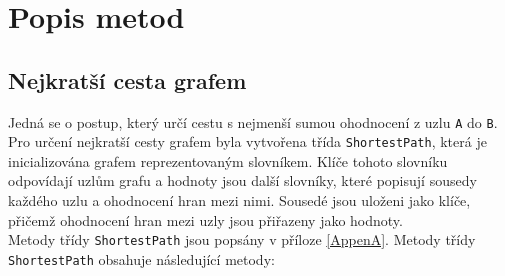 \section{Popis metod}
\subsection{Nejkratší cesta grafem}

Jedná se o postup, který určí cestu s nejmenší sumou ohodnocení z uzlu \texttt{A} do \texttt{B}. Pro určení nejkratší cesty grafem byla vytvořena třída \texttt{ShortestPath}, která je inicializována grafem reprezentovaným slovníkem. Klíče tohoto slovníku odpovídají uzlům grafu a hodnoty jsou další slovníky, které popisují sousedy každého uzlu a ohodnocení hran mezi nimi. Sousedé jsou uloženi jako klíče, přičemž ohodnocení hran mezi uzly jsou přiřazeny jako hodnoty.\\
Metody třídy \texttt{ShortestPath} jsou popsány v příloze \ref{AppenA}. Metody třídy \texttt{ShortestPath} obsahuje následující metody:
